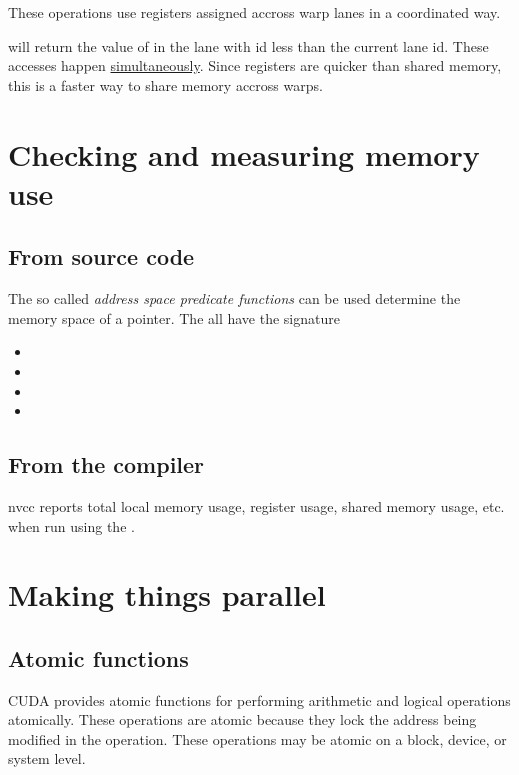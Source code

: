 \documentclass[a4paper,titlepage,12pt]{article}
\begin{document}
\begin{description}[left = \parindent]
These operations use registers assigned accross warp lanes in a coordinated way.
\begin{center}
\end{center}
will return the value of  in the lane with id  less than the current lane id.
These accesses happen \underline{simultaneously}.
Since registers are quicker than shared memory, this is a faster way to share memory accross warps.

\section{Checking and measuring memory use}
\label{sec:meas_mem}
\subsection{From source code}
The so called {\em address space predicate functions} can be used determine the memory space of a pointer.
The all have the signature 
\begin{itemize}
	\item {}
	\item {}
	\item {}
	\item {}
\end{itemize}

\subsection{From the compiler}

nvcc reports total local memory usage, register usage, shared memory usage, etc. when run using the .
\newpage
\section{Making things parallel}

\subsection{Atomic functions}

CUDA provides atomic functions for performing arithmetic and logical operations atomically.
These operations are atomic because they lock the address being modified in the operation.
These operations may be atomic on a block, device, or system level.


\end{description}
\end{document}
